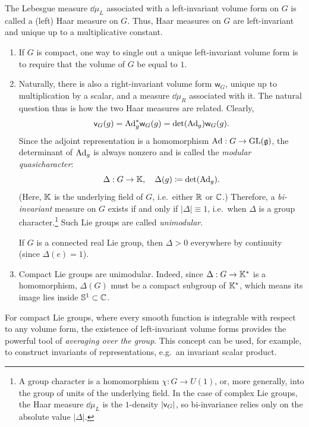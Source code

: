 \begin{defn}
    The Lebesgue measure $\dd\mu_L$ associated with a left-invariant volume form on $G$ is called a (left) Haar measure on $G$. Thus, Haar measures on $G$ are left-invariant and unique up to a multiplicative constant.
\end{defn}

\begin{rem}\label{rem biinvariant measures}
    \begin{enumerate}
        \item If $G$ is compact, one way to single out a unique left-invariant volume form is to require that the volume of $G$ be equal to $1$.
        \item Naturally, there is also a right-invariant volume form $\mathsf{w}_G$, unique up to multiplication by a scalar, and a measure $\dd\mu_R$ associated with it. The natural question thus is how the two Haar measures are related. Clearly,
        \[\mathsf{v}_G(g)=\mathrm{Ad}_g^\ast \mathsf{w}_G(g)=\det(\mathrm{Ad}_g)\mathsf{w}_G(g).\]
        Since the adjoint representation is a homomorphism $\mathrm{Ad}:G\to\operatorname{GL}(\mathfrak{g})$, the determinant of $\mathrm{Ad}_g$ is always nonzero and is called the \emph{modular quasicharacter}:
        \[\Delta: G\to \mathbb{K},\quad \Delta(g)\coloneqq\det(\mathrm{Ad}_g).\]
        (Here, $\mathbb{K}$ is the underlying field of $G$, i.e.\ either $\mathbb{R}$ or $\mathbb{C}$.)
        Therefore, a \emph{bi-invariant} measure on $G$ exists if and only if $|\Delta|\equiv 1$, i.e.~when $\Delta$ is a group character.\footnote{A group character is a homomorphism $\chi:G\to U(1)$, or, more generally, into the group of units of the underlying field. In the case of complex Lie groups, the Haar measure $\dd \mu_L$ is the $1$-density $|\mathsf{v}_G|$, so bi-invariance relies only on the absolute value $|\Delta|$.} Such Lie groups are called \emph{unimodular}.
        
        If $G$ is a connected real Lie group, then $\Delta>0$ everywhere by continuity (since $\Delta(e)=1$). 
        \item Compact Lie groups are unimodular. Indeed, since $\Delta:G\to \mathbb{K}^\ast$ is a homomorphism, $\Delta(G)$ must be a compact subgroup of $\mathbb{K}^\ast$, which means its image lies inside $\mathbb{S}^1\subset\mathbb{C}$.
    \end{enumerate}
\end{rem}



For compact Lie groups, where every smooth function is integrable with respect to any volume form, the existence of left-invariant volume forms provides the powerful tool of \emph{averaging over the group}. This concept can be used, for example, to construct invariants of representations, e.g.~an invariant scalar product.

